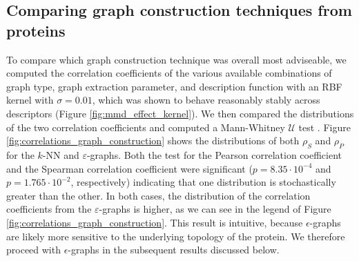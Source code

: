 \subsection{Comparing graph construction techniques from proteins}\label{sec:techniques} To compare which graph
construction technique was overall most adviseable, we computed the correlation
coefficients of the various available combinations of graph type, graph
extraction parameter, and description function with an RBF kernel with
$\sigma=0.01$, which was shown to behave reasonably stably across descriptors
(Figure \ref{fig:mmd_effect_kernel}). We then compared the distributions of the
two correlation coefficients and computed a Mann-Whitney $\mathcal{U}$ test
\citep{fay2010wilcoxon}. Figure \ref{fig:correlations_graph_construction} shows
the distributions of both $\rho_S$ and $\rho_P$ for the $k$-NN and
$\varepsilon$-graphs. Both the test for the Pearson correlation coefficient and
the Spearman correlation coefficient were significant ($p=8.35\cdot 10^{-4}$ and
$p=1.765\cdot 10^{-2}$, respectively) indicating that one distribution is
stochastically greater than the other. In both cases, the distribution of the
correlation coefficients from the $\varepsilon$-graphs is higher, as we can see
in the legend of Figure \ref{fig:correlations_graph_construction}. This result
is intuitive, because $\epsilon$-graphs are likely more sensitive to the
underlying topology of the protein. We therefore proceed with $\epsilon$-graphs
in the subsequent results discussed below.

